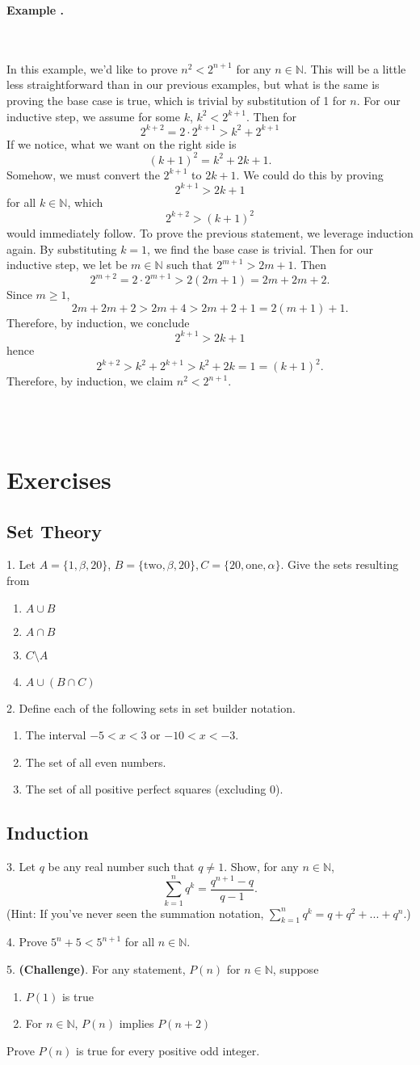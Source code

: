 \documentclass[11pt]{article}
\numberwithin{lemma}{section}
\numberwithin{equation}{section}
\numberwithin{define}{section}
\numberwithin{prop}{section}
\numberwithin{figure}{section}
\numberwithin{theorem}{section}
\newcounter{ex}[section]
\newenvironment{ex}[0]{

	\refstepcounter{ex}
	\begin{large}
    \textbf{Example \theex .}
    \end{large}\\\\
    }
    {
    \\\\
    }
\numberwithin{ex}{section}
\def\nat{\mathbb{N}}
\begin{document}
\begin{ex}
	In this example, we'd like to prove $n^2<2^{n+1}$ for any $n\in\nat$. This will be a little less straightforward than in our previous examples, but what is the same is proving the base case is true, which is trivial by substitution of 1 for $n$. For our inductive step, we assume for some $k$, $k^2<2^{k+1}$. Then for
	$$2^{k+2}=2\cdot 2^{k+1}>k^2+2^{k+1}$$
	If we notice, what we want on the right side is 
	$$(k+1)^2=k^2+2k+1.$$
	Somehow, we must convert the $2^{k+1}$ to $2k+1$. We could do this by proving 
	$$2^{k+1}>2k+1$$ 
	for all $k\in\nat$, which 
	$$2^{k+2}>(k+1)^2$$ 
	would immediately follow.
	To prove the previous statement, we leverage induction again. By substituting $k=1$, we find the base case is trivial. Then for our inductive step, we let be $m\in\nat$ such that $2^{m+1}>2m+1$.
	Then
	$$2^{m+2}=2\cdot2^{m+1}>2(2m+1)=2m+2m+2.$$
	Since $m\ge 1$,
	$$2m+2m+2>2m+4>2m+2+1=2(m+1)+1.$$
	Therefore, by induction, we conclude 
	$$2^{k+1}>2k+1$$
	hence
	$$2^{k+2}>k^2+2^{k+1}>k^2+2k=1=(k+1)^2.$$
	Therefore, by induction, we claim $n^2<2^{n+1}$.
\end{ex}

\section{Exercises}
\subsection{Set Theory}
1. Let $A=\{1,\beta,20\}$, $B=\{\text{two},\beta,20\},C=\{20,\text{one},\alpha\}$. Give the sets resulting from
\begin{enumerate}[label=\alph*)]
	\item $A \cup B$
	\item $A \cap B$
	\item $C \setminus A$
	\item $A \cup (B\cap C)$
\end{enumerate}
2. Define each of the following sets in set builder notation.
\begin{enumerate}[label=\alph*)]
	\item The interval $-5<x<3$ or $-10<x<-3$.
	\item The set of all even numbers.
	\item The set of all positive perfect squares (excluding 0).
\end{enumerate}
\subsection{Induction}
3. Let $q$ be any real number such that $q\neq1$. Show, for any $n\in\nat$,
$$\sum_{k=1}^nq^k=\frac{q^{n+1}-q}{q-1}.$$
(Hint: If you've never seen the summation notation, $\sum_{k=1}^nq^k=q+q^2+...+q^n$.)

4. Prove $5^n+5<5^{n+1}$ for all $n\in\nat$.

5. \textbf{(Challenge)}. For any statement, $P(n)$ for $n\in\nat$, suppose 
\begin{enumerate}
	\item $P(1)$ is true
	\item For $n\in\nat$, $P(n)$ implies $P(n+2)$
\end{enumerate}
Prove $P(n)$ is true for every positive odd integer. 
\end{document}
